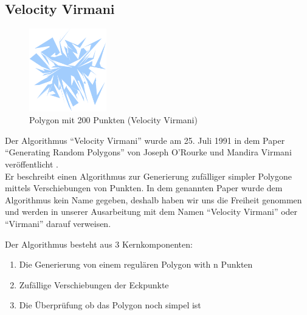 \subsection{Velocity Virmani}

\begin{figure}[h]
\begin{center}
\includegraphics[width=0.3\textwidth]{img/virmani200.eps}
\end{center}
\caption{Polygon mit 200 Punkten (Velocity Virmani)}
\label{fig:virmani200}
\end{figure}

Der Algorithmus \enquote{Velocity Virmani} wurde am 25. Juli 1991 in dem Paper \enquote{Generating Random Polygons} von Joseph O'Rourke und Mandira Virmani veröffentlicht \cite{virmani91polygons}.\smallskip \\ 
Er beschreibt einen Algorithmus zur Generierung zufälliger simpler Polygone mittels Verschiebungen von Punkten. In dem genannten Paper wurde dem Algorithmus kein Name gegeben, deshalb haben wir uns die Freiheit genommen und werden in unserer Ausarbeitung mit dem Namen \enquote{Velocity Virmani} oder \enquote{Virmani} darauf verweisen.

Der Algorithmus besteht aus 3 Kernkomponenten:
\begin{enumerate}
	\item Die Generierung von einem regulären Polygon with n Punkten
	\item Zufällige Verschiebungen der Eckpunkte
	\item Die Überprüfung ob das Polygon noch simpel ist
\end{enumerate}

